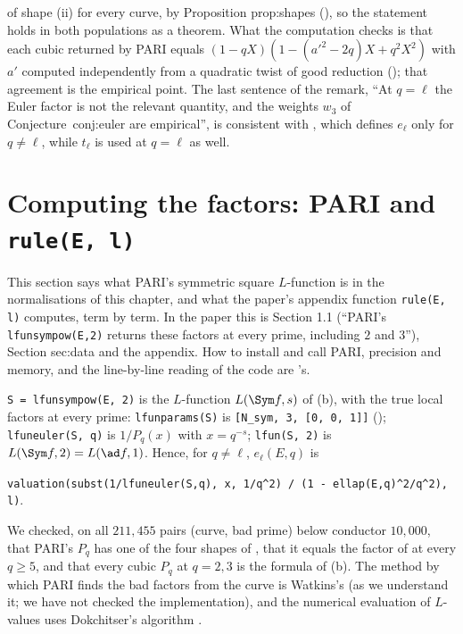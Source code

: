 \begin{remark}
of shape (ii) for every curve, by Proposition prop:shapes (), so the statement holds in both populations as a theorem. What the
computation checks is that each cubic returned by PARI equals $(1-qX)(1-(a'^2-2q)X+q^2X^2)$ with $a'$ computed independently from a quadratic twist of good reduction
(); that agreement is the empirical point. The last sentence of the remark, ``At $q=\ell$ the Euler factor is not the relevant quantity, and the weights $w_3$ of
Conjecture~conj:euler are empirical'', is consistent with , which defines $e_\ell$ only for $q\ne\ell$, while $t_\ell$ is used at $q=\ell$ as well.
\end{remark}

\section{Computing the factors: PARI and \texttt{rule(E, l)}}\label{sec:lfunctions:pari}

This section says what PARI's symmetric square $L$-function is in the normalisations of this chapter, and what the paper's appendix function \texttt{rule(E, l)}
computes, term by term. In the paper this is Section 1.1 (``PARI's \texttt{lfunsympow(E,2)} returns these factors at every prime, including $2$ and $3$''), Section
sec:data and the appendix. How to install and call PARI, precision and memory, and the line-by-line reading of the code are 's.

\begin{remark}\label{rem:lfunctions:pari}
\texttt{S = lfunsympow(E, 2)} is the $L$-function $L(\Sym f,s)$ of (b), with the true local factors at every prime: \texttt{lfunparams(S)} is
\texttt{[N\_sym, 3, [0, 0, 1]]} (); \texttt{lfuneuler(S, q)} is $1/P_q(x)$ with $x=q^{-s}$; \texttt{lfun(S, 2)} is $L(\Sym f,2)=L(\ad f,1)$. Hence, for $q\ne\ell$, $e_\ell(E,q)$ is
\begin{center}
\texttt{valuation(subst(1/lfuneuler(S,q), x, 1/q\^{}2) / (1 - ellap(E,q)\^{}2/q\^{}2), l)}.
\end{center}
We checked, on all $211{,}455$ pairs (curve, bad prime) below conductor $10{,}000$, that PARI's $P_q$ has one of the four shapes of , that
it equals the factor of  at every $q\ge5$, and that every cubic $P_q$ at $q=2,3$ is the formula of (b). The method by which PARI finds the bad factors from the curve is Watkins's \cite{Watkins02} (as we understand it; we have not checked the
implementation), and the numerical evaluation of $L$-values uses Dokchitser's algorithm \cite{Dokchitser04}.
\end{remark}

